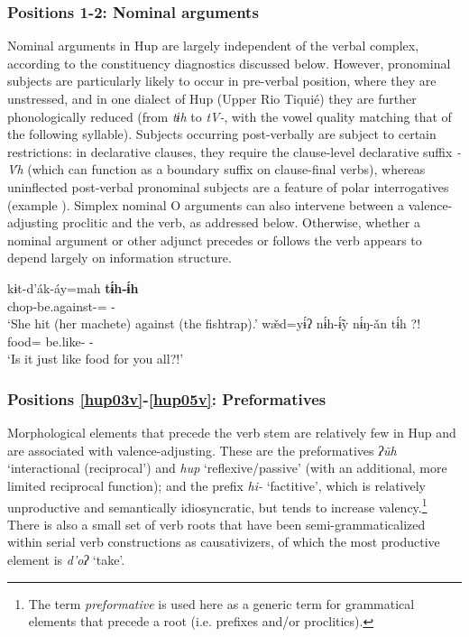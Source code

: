 \documentclass[output=paper]{langscibook}
\begin{document}
\subsubsection{Positions 1-2: Nominal arguments}
\label{sec:hup:key:3.1.1}

Nominal arguments in Hup are largely independent of the verbal complex, according to the constituency diagnostics discussed below. However, pronominal subjects are particularly likely to occur in pre-verbal position, where they are unstressed, and in one dialect of Hup (Upper Rio Tiquié) they are further phonologically reduced (from \textit{tɨh} to \textit{tV-}, with the vowel quality matching that of the following syllable). Subjects occurring post-verbally are subject to certain restrictions: in declarative clauses, they require the clause-level declarative suffix \textit{{}-\'{V}h} (which can function as a boundary suffix on clause-final verbs), whereas uninflected post-verbal pronominal subjects are a feature of polar interrogatives (example ). Simplex nominal O arguments can also intervene between a valence-adjusting proclitic and the verb, as addressed below. Otherwise, whether a nominal argument or other adjunct precedes or follows the verb appears to depend largely on information structure.

\ea\label{ex:hup:key:4} 
    \ea\label{ex:hup:key:4a} {
    \gll kɨt-d'ák-áy=mah \textbf{tɨ́h-ɨ́h}\\ 
    chop-be.against-\Dynm{}=\Rep{} \Third\Sg{}-\Decl{} \\ 
    \glt `She hit (her machete) against (the fishtrap).' 
    }
    \ex\label{ex:hup:key:4b} {
    \gll w\v{æ}d=yɨ́ʔ nɨ́h-ɨ̃́y nɨ́ŋ-ǎn tɨ́h ?! \\
     food=\Adv{} be.like-\Dynm{} \Second\Pl-\Obj{} \Third\Sg{} \\ 
     \glt `Is it just like food for you all?!' 
    }
    \z 
\z 


\subsubsection{Positions \ref{hup03v}-\ref{hup05v}: Preformatives} \label{sec:hup:key:3.1.2}

Morphological elements that precede the verb stem are relatively few in Hup and are associated with valence-adjusting. These are the preformatives \textit{ʔ\~uh} `interactional (reciprocal') and \textit{hup} `reflexive/passive' (with an additional, more limited reciprocal function); and the prefix \textit{hi-} `factitive', which is relatively unproductive and semantically idiosyncratic, but tends to increase valency.\footnote{The term \textit{preformative} is used here as a generic term for grammatical elements that precede a root (i.e. prefixes and/or proclitics).} There is also a small set of verb roots that have been semi-grammaticalized within serial verb constructions as causativizers, of which the most productive element is \textit{d'oʔ} `take'. 
\end{document}
